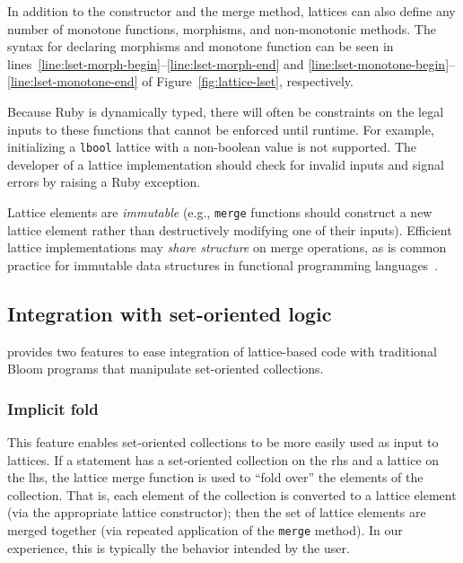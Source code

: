 In addition to the constructor and the merge method, lattices can also define
any number of monotone functions, morphisms, and non-monotonic methods. The
syntax for declaring morphisms and monotone function can be seen in
lines~\ref{line:lset-morph-begin}--\ref{line:lset-morph-end} and
\ref{line:lset-monotone-begin}--\ref{line:lset-monotone-end} of
Figure~\ref{fig:lattice-lset}, respectively.

Because Ruby is dynamically typed, there will often be constraints on the legal
inputs to these functions that cannot be enforced until runtime. For example,
initializing a \texttt{lbool} lattice with a non-boolean value is not
supported. The developer of a lattice implementation should check for invalid
inputs and signal errors by raising a Ruby exception.

Lattice elements are \emph{immutable} (e.g., \texttt{merge} functions should
construct a new lattice element rather than destructively modifying one of their
inputs). Efficient lattice implementations may \emph{share structure} on merge
operations, as is common practice for immutable data structures in functional
programming
languages~\cite{Okasaki1999}. %

\subsection{Integration with set-oriented logic}
\label{sec:bloom-interop}
\lang provides two features to ease integration of lattice-based code with
traditional Bloom programs that manipulate set-oriented collections.

\subsubsection{Implicit fold}
This feature enables set-oriented collections to be more easily used as input to
lattices. If a \lang statement has a set-oriented collection on the rhs and a lattice
on the lhs, the lattice merge function is used to ``fold over'' the elements of
the collection. That is, each element of the collection is converted to a
lattice element (via the appropriate lattice constructor); then the set of
lattice elements are merged together (via repeated application of the
\texttt{merge} method). In our experience, this is typically the behavior
intended by the user.

